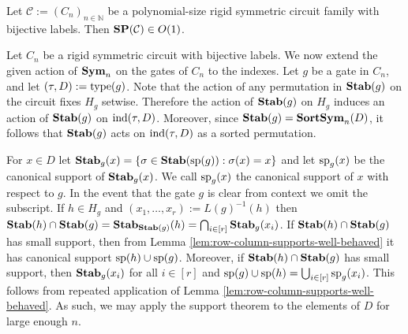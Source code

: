 \documentclass[../paper.tex]{subfiles}
\begin{document}
\begin{cor}
  Let $\mathcal{C} := (C_n)_{n \in \mathbb{N}}$ be a polynomial-size rigid
  symmetric circuit family with bijective labels. Then $\text{\textbf{SP}}(\mathcal{C}) \in
  O(1)$.
\end{cor}



Let $C_n$ be a rigid symmetric circuit with bijective labels. We now extend the
given action of $\text{\textbf{Sym}}_n$ on the gates of $C_n$ to the indexes. Let $g$ be a gate
in $C_n$, and let $(\tau, D) := \text{type}(g)$. Note that the action of any
permutation in $\text{\textbf{Stab}}(g)$ on the circuit fixes $H_g$ setwise. Therefore the
action of $\text{\textbf{Stab}}(g)$ on $H_g$ induces an action of $\text{\textbf{Stab}}(g)$ on $\text{\upshape ind}(\tau,
D)$. Moreover, since $\text{\textbf{Stab}}(g) = \text{\textbf{SortSym}}_n(D)$, it follows that $\text{\textbf{Stab}}(g)$ acts
on $\text{\upshape ind}(\tau, D)$ as a sorted permutation.

For $x \in D$ let $\text{\textbf{Stab}}_g(x) = \{\sigma \in \text{\textbf{Stab}}(\text{sp}(g)) : \sigma (x) =
x\}$ and let $\text{sp}_g(x)$ be the canonical support of $\text{\textbf{Stab}}_g(x)$. We call
$\text{sp}_g(x)$ the canonical support of $x$ with respect to $g$. In the event
that the gate $g$ is clear from context we omit the subscript. If $h \in H_g$
and $(x_1, \ldots ,x_r) := L(g)^{-1}(h)$ then $\text{\textbf{Stab}}(h) \cap \text{\textbf{Stab}}(g) =
\text{\textbf{Stab}}_{\text{\textbf{Stab}}(g)}(h) = \bigcap_{i \in [r]} \text{\textbf{Stab}}_g(x_i)$. If $\text{\textbf{Stab}}(h) \cap
\text{\textbf{Stab}}(g)$ has small support, then from Lemma
\ref{lem:row-column-supports-well-behaved} it has canonical support $\text{sp}(h)
\cup \text{sp}(g)$. Moreover, if $\text{\textbf{Stab}}(h) \cap \text{\textbf{Stab}}(g)$ has small support, then
$\text{\textbf{Stab}}_g(x_i)$ for all $i \in [r]$ and $\text{sp}(g) \cup \text{sp}(h) = \bigcup_{i
  \in [r]}\text{sp}_g(x_i)$. This follows from repeated application of Lemma
\ref{lem:row-column-supports-well-behaved}. As such, we may apply the support
theorem to the elements of $D$ for large enough $n$.


\end{document}
